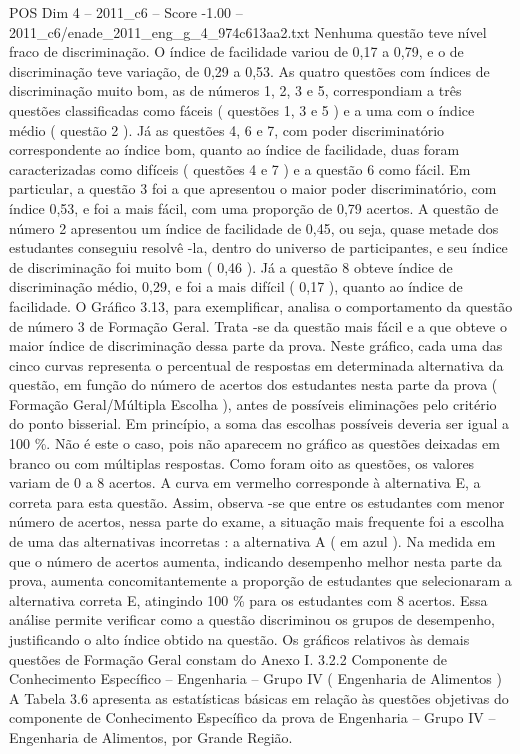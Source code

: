 \begin{textsample}{POS Dim 4 – 2011\_c6 – Score -1.00 – 2011\_c6/enade\_2011\_eng\_g\_4\_974c613aa2.txt}
Nenhuma questão teve nível fraco de discriminação.
O índice de facilidade variou de 0,17 a 0,79, e o de discriminação teve variação, de 0,29 a 0,53.
As quatro questões com índices de discriminação muito bom, as de números 1, 2, 3 e 5, correspondiam a três questões classificadas como fáceis ( questões 1, 3 e 5 ) e a uma com o índice médio ( questão 2 ).
Já as questões 4, 6 e 7, com poder discriminatório correspondente ao índice bom, quanto ao índice de facilidade, duas foram caracterizadas como difíceis ( questões 4 e 7 ) e a questão 6 como fácil.
Em particular, a questão 3 foi a que apresentou o maior poder discriminatório, com índice 0,53, e foi a mais fácil, com uma proporção de 0,79 acertos.
A questão de número 2 apresentou um índice de facilidade de 0,45, ou seja, quase metade dos estudantes conseguiu resolvê -la, dentro do universo de participantes, e seu índice de discriminação foi muito bom ( 0,46 ).
Já a questão 8 obteve índice de discriminação médio, 0,29, e foi a mais difícil ( 0,17 ), quanto ao índice de facilidade.
O Gráfico 3.13, para exemplificar, analisa o comportamento da questão de número 3 de Formação Geral.
Trata -se da questão mais fácil e a que obteve o maior índice de discriminação dessa parte da prova.
Neste gráfico, cada uma das cinco curvas representa o percentual de respostas em determinada alternativa da questão, em função do número de acertos dos estudantes nesta parte da prova ( Formação Geral/Múltipla Escolha ), antes de possíveis eliminações pelo critério do ponto bisserial.
Em princípio, a soma das escolhas possíveis deveria ser igual a 100 \%.
Não é este o caso, pois não aparecem no gráfico as questões deixadas em branco ou com múltiplas respostas.
Como foram oito as questões, os valores variam de 0 a 8 acertos.
A curva em vermelho corresponde à alternativa E, a correta para esta questão.
Assim, observa -se que entre os estudantes com menor número de acertos, nessa parte do exame, a situação mais frequente foi a escolha de uma das alternativas incorretas : a alternativa A ( em azul ).
Na medida em que o número de acertos aumenta, indicando desempenho melhor nesta parte da prova, aumenta concomitantemente a proporção de estudantes que selecionaram a alternativa correta E, atingindo 100 \% para os estudantes com 8 acertos.
Essa análise permite verificar como a questão discriminou os grupos de desempenho, justificando o alto índice obtido na questão.
Os gráficos relativos às demais questões de Formação Geral constam do Anexo I. 3.2.2 Componente de Conhecimento Específico – Engenharia – Grupo IV ( Engenharia de Alimentos ) A Tabela 3.6 apresenta as estatísticas básicas em relação às questões objetivas do componente de Conhecimento Específico da prova de Engenharia – Grupo IV – Engenharia de Alimentos, por Grande Região.

\end{textsample}

